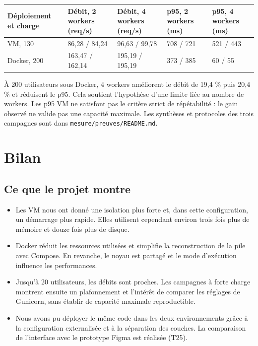 \documentclass[a4paper,11pt]{article}
\begin{document}
\begin{center}\begin{minipage}{\linewidth}\small
{}\label{tab:workers}
\begin{tabularx}{\linewidth}{YYYYY}
\toprule
\textbf{Déploiement et charge} & \textbf{Débit, 2 workers (req/s)} & \textbf{Débit, 4 workers (req/s)} & \textbf{p95, 2 workers (ms)} & \textbf{p95, 4 workers (ms)} \\
\midrule
VM, 130 & 86,28 / 84,24 & 96,63 / 99,78 & 708 / 721 & 521 / 443 \\
Docker, 200 & 163,47 / 162,14 & 195,19 / 195,19 & 373 / 385 & 60 / 55 \\
\bottomrule
\end{tabularx}
\end{minipage}\end{center}
À 200 utilisateurs sous Docker, 4 workers améliorent le débit de 19,4 \% puis 20,4 \% et réduisent le p95. Cela soutient l'hypothèse d'une limite liée au nombre de workers. Les p95 VM ne satisfont pas le critère strict de répétabilité : le gain observé ne valide pas une capacité maximale. Les synthèses et protocoles des trois campagnes sont dans \nolinkurl{mesure/preuves/README.md}.

\clearpage
\section{Bilan}
\subsection{Ce que le projet montre}
\begin{itemize}
\item Les VM nous ont donné une isolation plus forte et, dans cette configuration, un démarrage plus rapide. Elles utilisent cependant environ trois fois plus de mémoire et douze fois plus de disque.
\item Docker réduit les ressources utilisées et simplifie la reconstruction de la pile avec Compose. En revanche, le noyau est partagé et le mode d'exécution influence les performances.
\item Jusqu'à 20 utilisateurs, les débits sont proches. Les campagnes à forte charge montrent ensuite un plafonnement et l'intérêt de comparer les réglages de Gunicorn, sans établir de capacité maximale reproductible.
\item Nous avons pu déployer le même code dans les deux environnements grâce à la configuration externalisée et à la séparation des couches. La comparaison de l'interface avec le prototype Figma est réalisée (T25).
\end{itemize}
\end{document}
